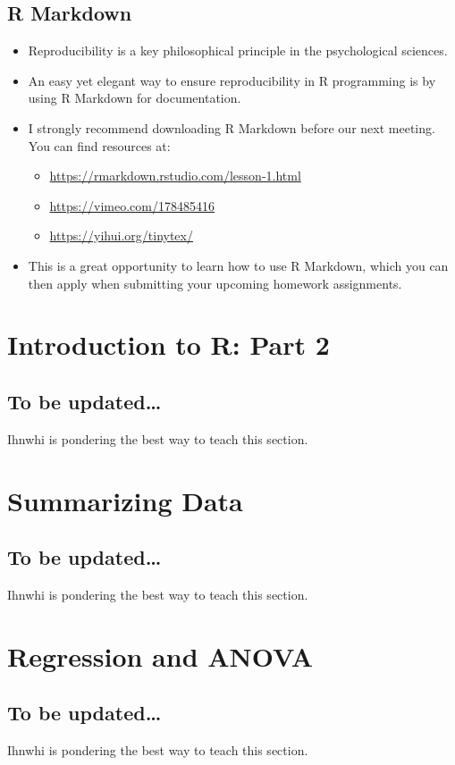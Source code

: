 \documentclass[
]{book}
\providecommand{\tightlist}{%
  \setlength{\itemsep}{0pt}\setlength{\parskip}{0pt}}
\begin{document}
\section{R Markdown}\label{r-markdown}

\begin{itemize}
\item
  Reproducibility is a key philosophical principle in the psychological sciences.
\item
  An easy yet elegant way to ensure reproducibility in R programming is by using R Markdown for documentation.
\item
  I strongly recommend downloading R Markdown before our next meeting. You can find resources at:

  \begin{itemize}
  \tightlist
  \item
    \url{https://rmarkdown.rstudio.com/lesson-1.html}
  \item
    \url{https://vimeo.com/178485416}
  \item
    \url{https://yihui.org/tinytex/}
  \end{itemize}
\item
  This is a great opportunity to learn how to use R Markdown, which you can then apply when submitting your upcoming homework assignments.
\end{itemize}

\chapter{Introduction to R: Part 2}\label{introduction-to-r-part-2}

\section{To be updated\ldots{}}\label{to-be-updated}

Ihnwhi is pondering the best way to teach this section.

\chapter{Summarizing Data}\label{summarizing-data}

\section{To be updated\ldots{}}\label{to-be-updated-1}

Ihnwhi is pondering the best way to teach this section.

\chapter{Regression and ANOVA}\label{regression-and-anova}

\section{To be updated\ldots{}}\label{to-be-updated-2}

Ihnwhi is pondering the best way to teach this section.

  
\end{document}
